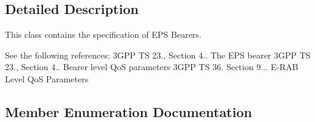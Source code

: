 \subsection{Detailed Description}
This class contains the specification of E\+PS Bearers.

See the following references\+: 3\+G\+PP TS 23., Section 4.. The E\+PS bearer 3\+G\+PP TS 23., Section 4.. Bearer level QoS parameters 3\+G\+PP TS 36. Section 9... E-\/\+R\+AB Level QoS Parameters 

\subsection{Member Enumeration Documentation}
